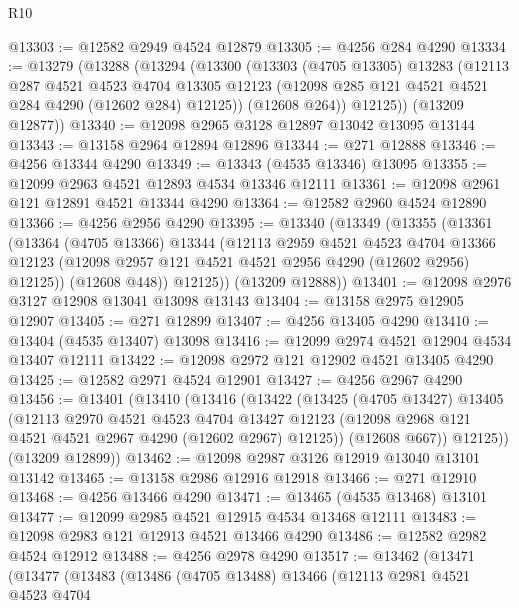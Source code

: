 \begin{lexlean}{R10}
\begin{coremodule}
@13303 := @12582 @2949 @4524 @12879
@13305 := @4256 @284 @4290
@13334 := @13279
    (@13288
      (@13294
        (@13300
          (@13303
            (@4705 @13305)
            @13283
            (@12113
              @287
              @4521
              @4523
              @4704
              @13305
              @12123
              (@12098 @285 @121 @4521 @4521 @284 @4290 (@12602 @284) @12125))
            (@12608 @264))
          @12125))
      (@13209 @12877))
@13340 := @12098 @2965 @3128 @12897 @13042 @13095 @13144
@13343 := @13158 @2964 @12894 @12896
@13344 := @271 @12888
@13346 := @4256 @13344 @4290
@13349 := @13343 (@4535 @13346) @13095
@13355 := @12099 @2963 @4521 @12893 @4534 @13346 @12111
@13361 := @12098 @2961 @121 @12891 @4521 @13344 @4290
@13364 := @12582 @2960 @4524 @12890
@13366 := @4256 @2956 @4290
@13395 := @13340
    (@13349
      (@13355
        (@13361
          (@13364
            (@4705 @13366)
            @13344
            (@12113
              @2959
              @4521
              @4523
              @4704
              @13366
              @12123
              (@12098 @2957 @121 @4521 @4521 @2956 @4290 (@12602 @2956) @12125))
            (@12608 @448))
          @12125))
      (@13209 @12888))
@13401 := @12098 @2976 @3127 @12908 @13041 @13098 @13143
@13404 := @13158 @2975 @12905 @12907
@13405 := @271 @12899
@13407 := @4256 @13405 @4290
@13410 := @13404 (@4535 @13407) @13098
@13416 := @12099 @2974 @4521 @12904 @4534 @13407 @12111
@13422 := @12098 @2972 @121 @12902 @4521 @13405 @4290
@13425 := @12582 @2971 @4524 @12901
@13427 := @4256 @2967 @4290
@13456 := @13401
    (@13410
      (@13416
        (@13422
          (@13425
            (@4705 @13427)
            @13405
            (@12113
              @2970
              @4521
              @4523
              @4704
              @13427
              @12123
              (@12098 @2968 @121 @4521 @4521 @2967 @4290 (@12602 @2967) @12125))
            (@12608 @667))
          @12125))
      (@13209 @12899))
@13462 := @12098 @2987 @3126 @12919 @13040 @13101 @13142
@13465 := @13158 @2986 @12916 @12918
@13466 := @271 @12910
@13468 := @4256 @13466 @4290
@13471 := @13465 (@4535 @13468) @13101
@13477 := @12099 @2985 @4521 @12915 @4534 @13468 @12111
@13483 := @12098 @2983 @121 @12913 @4521 @13466 @4290
@13486 := @12582 @2982 @4524 @12912
@13488 := @4256 @2978 @4290
@13517 := @13462
    (@13471
      (@13477
        (@13483
          (@13486
            (@4705 @13488)
            @13466
            (@12113
              @2981
              @4521
              @4523
              @4704

\end{coremodule}
\end{lexlean}

